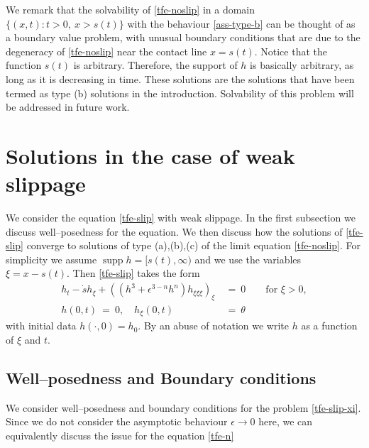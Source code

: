 \documentclass[pagesize,pdftex]{amsart}
\newcommand{\eps}{\epsilon}
\newcommand{\ang}{\theta}
\DeclareMathOperator{\supp}{supp}
\begin{document}
\medskip

We remark that the solvability of \eqref{tfe-noslip} in a domain
$\{ (x,t) :t>0,\ x>s(t)\} $ with the behaviour \eqref{ass-type-b} can be thought
of as a boundary value problem, with unusual boundary conditions that are due to
the degeneracy of \eqref{tfe-noslip} near the contact line $x=s(t)$. Notice that
the function $s(t)$ is arbitrary. Therefore, the support of $h$ is basically
arbitrary, as long as it is decreasing in time. These solutions are the
solutions that have been termed as type (b) solutions in the
introduction. Solvability of this problem will be addressed in future work.

\section{Solutions in the case of  weak slippage} \label{sec-slip} %

We consider the equation \eqref{tfe-slip} with weak slippage. In the first
subsection we discuss well--posedness for the equation. We then discuss how the
solutions of \eqref{tfe-slip} converge to solutions of type (a),(b),(c) of the
limit equation \eqref{tfe-noslip}. For simplicity we assume
$\supp h = [s(t),\infty)$ and we use the variables $\xi = x - s(t)$. Then
\eqref{tfe-slip} takes the form
  \begin{align} \label{tfe-slip-xi} %
    h_t  - \dot s h_\xi +(( h^3 + \eps^{3-n} h^n) h_{\xi\xi\xi})_\xi \ &= \ 0  \qquad 
    \text{for $\xi > 0$}, \\
    h(0,t) \ = \ 0, \quad h_\xi(0,t)  \ &= \ \ang
  \end{align}
  with initial data $h(\cdot,0) = h_0$. By an abuse of notation we write 
  $h$ as a function of $\xi$ and $t$.


\subsection{Well--posedness and Boundary conditions}

We consider well--posedness and boundary conditions for the problem
\eqref{tfe-slip-xi}. Since we do not consider the asymptotic behaviour
$\eps \to 0$ here, we can equivalently discuss the issue for the equation
\eqref{tfe-n}
\end{document}

